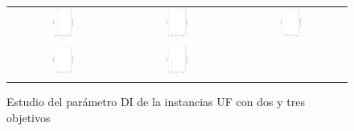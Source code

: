 \begin{figure}[h]
\centering
\caption{Estudio del parámetro DI de la instancias UF con dos y tres objetivos}
\label{fig:Scalability_Study_HV_1}
\begin{tabular}{ccc}
   \includegraphics[width=0.2\textwidth, angle=-90,origin=c]{Figures_Chapter7/Results_Chapter3/EPS_DI/UF1.eps} &
   \includegraphics[width=0.2\textwidth, angle=-90,origin=c]{Figures_Chapter7/Results_Chapter3/EPS_DI/UF2.eps} &
   \includegraphics[width=0.2\textwidth,angle=-90,origin=c]{Figures_Chapter7/Results_Chapter3/EPS_DI/UF3.eps}  
    \\ 
   \includegraphics[width=0.2\textwidth, angle=-90,origin=c]{Figures_Chapter7/Results_Chapter3/EPS_DI/UF4.eps} &
   \includegraphics[width=0.2\textwidth, angle=-90,origin=c]{Figures_Chapter7/Results_Chapter3/EPS_DI/UF5.eps} &

\end{tabular}
\end{figure}
